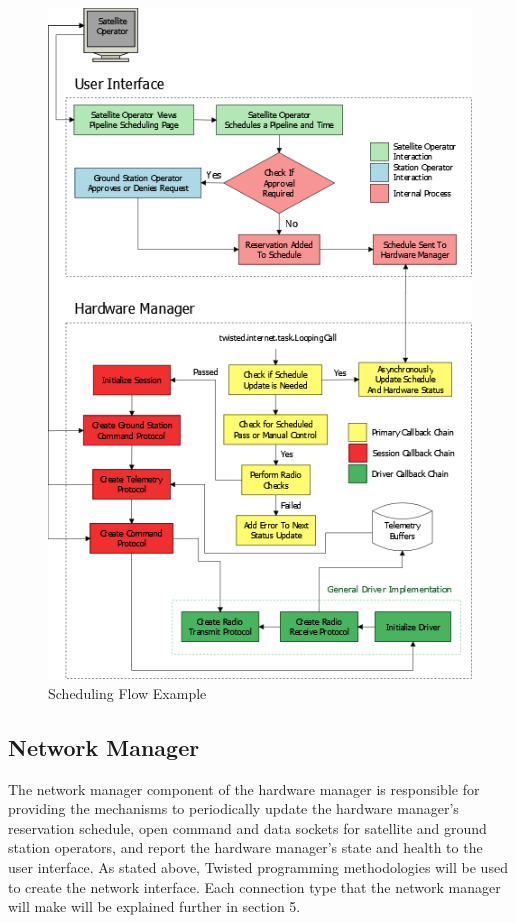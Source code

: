 \documentclass{mxl-design}
\begin{document}
\begin{figure}[hbtp]
\centering
\includegraphics[scale=.55]{reservation_flow.png}
\caption{Scheduling Flow Example}
\end{figure}

\subsection{Network Manager}
The network manager component of the hardware manager is responsible for providing the mechanisms to periodically update the hardware manager's reservation schedule, open command and data sockets for satellite and ground station operators, and report the hardware manager's state and health to the user interface. As stated above, Twisted programming methodologies will be used to create the network interface.  Each connection type that the network manager will make will be explained further in section 5.
\end{document}
